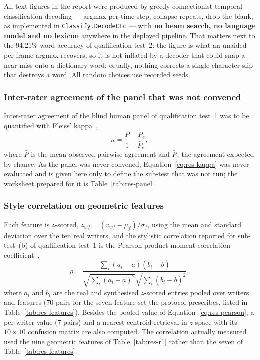 All text figures in the report were produced by greedy connectionist temporal classification decoding --- argmax per time step, collapse repeats, drop the blank, as implemented in \texttt{Classify.DecodeCtc} --- with \textbf{no beam search, no language model and no lexicon} anywhere in the deployed pipeline.
That matters next to the 94.21\% word accuracy of qualification test~2: the figure is what an unaided per-frame argmax recovers, so it is not inflated by a decoder that could snap a near-miss onto a dictionary word; equally, nothing corrects a single-character slip that destroys a word.
All random choices use recorded seeds.

\subsubsection{Inter-rater agreement of the panel that was not convened}

Inter-rater agreement of the blind human panel of qualification test~1 was to be quantified with Fleiss' kappa~\cite{fleiss1971},
\begin{equation}
\label{eq:res-kappa}
\kappa=\frac{\bar P-\bar P_e}{1-\bar P_e},
\end{equation}
where $\bar P$ is the mean observed pairwise agreement and $\bar P_e$ the agreement expected by chance.
As the panel was never convened, Equation~\ref{eq:res-kappa} was never evaluated and is given here only to define the sub-test that was not run; the worksheet prepared for it is Table~\ref{tab:res-panel}.

\subsubsection{Style correlation on geometric features}

Each feature is $z$-scored, $z_{wf}=(v_{wf}-\mu_f)/\sigma_f$, using the mean and standard deviation over the ten real writers, and the stylistic correlation reported for sub-test~(b) of qualification test~1 is the Pearson product-moment correlation coefficient~\cite{pearson1896},
\begin{equation}
\label{eq:res-pearson}
\rho=\frac{\sum_{i}(a_i-\bar a)(b_i-\bar b)}{\sqrt{\sum_i(a_i-\bar a)^2}\sqrt{\sum_i(b_i-\bar b)^2}},
\end{equation}
where $a_i$ and $b_i$ are the real and synthesised $z$-scored entries pooled over writers and features (70 pairs for the seven-feature set the protocol prescribes, listed in Table~\ref{tab:res-features}).
Besides the pooled value of Equation~\ref{eq:res-pearson}, a per-writer value (7 pairs) and a nearest-centroid retrieval in $z$-space with its $10\times10$ confusion matrix are also computed.
The correlation actually measured used the nine geometric features of Table~\ref{tab:res-r1} rather than the seven of Table~\ref{tab:res-features}.

